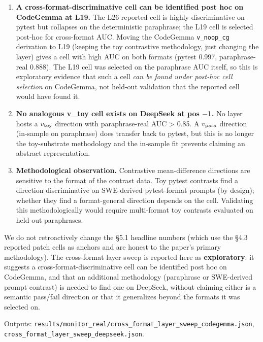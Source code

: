 \documentclass[
  11pt,
  a4paper]{article}
\providecommand{\tightlist}{%
  \setlength{\itemsep}{0pt}\setlength{\parskip}{0pt}}
\begin{document}
\begin{enumerate}
\def\labelenumi{\arabic{enumi}.}
\tightlist
\item
  \textbf{A cross-format-discriminative cell can be identified post hoc
  on CodeGemma at L19.} The L26 reported cell is highly discriminative
  on pytest but collapses on the deterministic paraphrase; the L19 cell
  is selected post-hoc for cross-format AUC. Moving the CodeGemma
  \texttt{v\_noop\_cg} derivation to L19 (keeping the toy contrastive
  methodology, just changing the layer) gives a cell with high AUC on
  both formats (pytest 0.997, paraphrase-real 0.888). The L19 cell was
  selected on the paraphrase AUC itself, so this is exploratory evidence
  that such a cell \emph{can be found under post-hoc cell selection} on
  CodeGemma, not held-out validation that the reported cell would have
  found it.
\item
  \textbf{No analogous v\_toy cell exists on DeepSeek at pos \ensuremath{-}1.} No
  layer hosts a \(v_{\rm toy}\) direction with paraphrase-real AUC
  \textgreater{} 0.85. A \(v_{\rm para}\) direction (in-sample on
  paraphrase) does transfer back to pytest, but this is no longer the
  toy-substrate methodology and the in-sample fit prevents claiming an
  abstract representation.
\item
  \textbf{Methodological observation.} Contrastive mean-difference
  directions are sensitive to the format of the contrast data. Toy
  pytest contrasts find a direction discriminative on SWE-derived
  pytest-format prompts (by design); whether they find a format-general
  direction depends on the cell. Validating this methodologically would
  require multi-format toy contrasts evaluated on held-out paraphrases.
\end{enumerate}

We do not retroactively change the \S{}5.1 headline numbers (which use the
\S{}4.3 reported patch cells as anchors and are honest to the paper's
primary methodology). The cross-format layer sweep is reported here as
\textbf{exploratory}: it suggests a cross-format-discriminative cell can
be identified post hoc on CodeGemma, and that an additional methodology
(paraphrase or SWE-derived prompt contrast) is needed to find one on
DeepSeek, without claiming either is a semantic pass/fail direction or
that it generalizes beyond the formats it was selected on.

Outputs:
\texttt{results/monitor\_real/cross\_format\_layer\_sweep\_codegemma.json},
\texttt{cross\_format\_layer\_sweep\_deepseek.json}.
\end{document}
